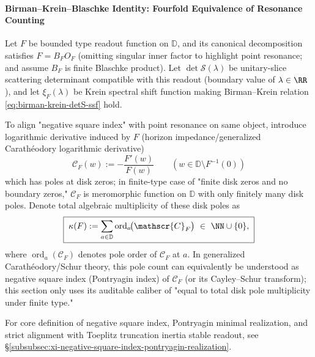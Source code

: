 \paragraph{Birman–Krein–Blaschke Identity: Fourfold Equivalence of Resonance Counting}
Let \(F\) be bounded type readout function on \(\mathbb{D}\), and its canonical decomposition satisfies \(F=B_FO_F\) (omitting singular inner factor to highlight point resonance; and assume \(B_F\) is finite Blaschke product).
Let \(\det\mathcal S(\lambda)\) be unitary-slice scattering determinant compatible with this readout (boundary value of \(\lambda\in\RR\)), and let \(\xi_F(\lambda)\) be Krein spectral shift function making Birman–Krein relation \eqref{eq:birman-krein-detS-ssf} hold.
\par
To align "negative square index" with point resonance on same object, introduce logarithmic derivative induced by \(F\) (horizon impedance/generalized Carathéodory logarithmic derivative)
\begin{equation}\label{eq:selfdual-CF-log-derivative}
\boxed{\;
\mathscr{C}_F(w):=-\frac{F'(w)}{F(w)}\qquad(w\in\mathbb{D}\setminus F^{-1}(0))\;}
\end{equation}
which has poles at disk zeros; in finite-type case of "finite disk zeros and no boundary zeros," \(\mathscr{C}_F\) is meromorphic function on \(\mathbb{D}\) with only finitely many disk poles.
Denote total algebraic multiplicity of these disk poles as
\begin{equation}\label{eq:selfdual-kappaF-polecount}
\boxed{\;
\kappa(F):=\sum_{a\in\mathbb{D}}\operatorname{ord}_{a}\!\bigl(\mathscr{C}_F\bigr)\ \in\ \NN\cup\{0\},\;}
\end{equation}
where \(\operatorname{ord}_{a}(\mathscr{C}_F)\) denotes pole order of \(\mathscr{C}_F\) at \(a\).
In generalized Carathéodory/Schur theory, this pole count can equivalently be understood as negative square index (Pontryagin index) of \(\mathscr{C}_F\) (or its Cayley–Schur transform); this section only uses its auditable caliber of "equal to total disk pole multiplicity under finite type."
\par
For core definition of negative square index, Pontryagin minimal realization, and strict alignment with Toeplitz truncation inertia stable readout, see \S\ref{subsubsec:xi-negative-square-index-pontryagin-realization}.

